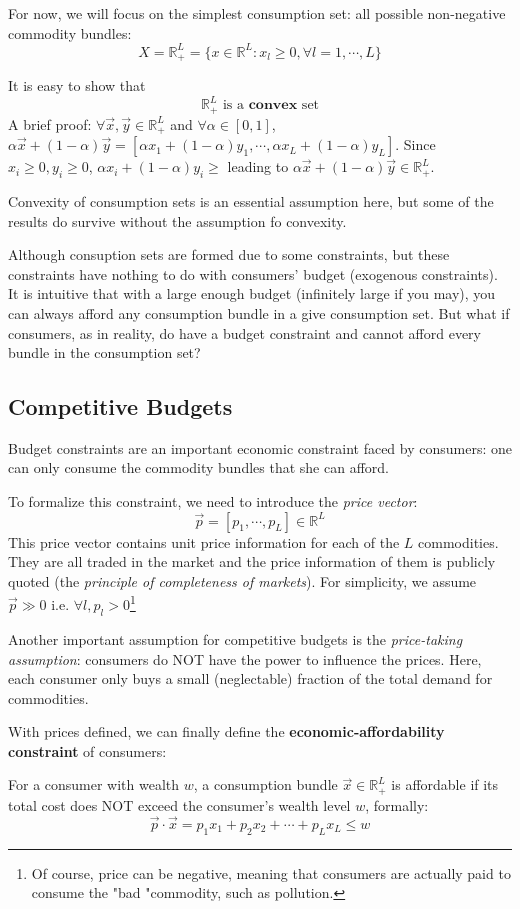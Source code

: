 For now, we will focus on the simplest consumption set: all possible non-negative commodity bundles:
$$X=\mathbb{R}^L_+=\{x\in \mathbb{R}^L: x_l\geq 0,\forall l=1,\cdots, L\}$$

It is easy to show that
$$\mathbb{R}^L_+ \text{ is a }\textbf{convex} \text{ set}$$
A brief proof: $\forall \vec{x},\vec{y}\in \mathbb{R}^L_+$ and $\forall\alpha \in [0,1]$, $\alpha\vec{x}+(1-\alpha)\vec{y}=\left[\alpha x_1+(1-\alpha)y_1,\cdots,\alpha x_L+(1-\alpha)y_L\right]$. Since $x_i\geq 0,y_i\geq 0$, $\alpha x_i+(1-\alpha)y_i\geq $ leading to $\alpha\vec{x}+(1-\alpha)\vec{y}\in \mathbb{R}^L_+$.

Convexity of consumption sets is an essential assumption here, but some of the results do survive without the assumption fo convexity.

Although consuption sets are formed due to some constraints, but these constraints have nothing to do with consumers' budget (exogenous constraints). It is intuitive that with a large enough budget (infinitely large if you may), you can always afford any consumption bundle in a give consumption set. But what if consumers, as in reality, do have a budget constraint and cannot afford every bundle in the consumption set?

\subsection{Competitive Budgets}
Budget constraints are an important economic constraint faced by consumers: one can only consume the commodity bundles that she can afford.

To formalize this constraint, we need to introduce the \textit{price vector}: 
$$\vec{p}=\left[p_1,\cdots,p_L\right]\in \mathbb{R}^L$$
This price vector contains unit price information for each of the $L$ commodities. They are all traded in the market and the price information of them is publicly quoted (the \textit{principle of completeness of markets}).
For simplicity, we assume $\vec{p}\gg 0$ i.e. $\forall l,p_l>0$\footnote{Of course, price can be negative, meaning that consumers are actually paid to consume the "bad "commodity, such as pollution.}

Another important assumption for competitive budgets is the \textit{price-taking assumption}: consumers do NOT have the power to influence the prices. Here, each consumer only buys a small (neglectable) fraction of the total demand for commodities.

With prices defined, we can finally define the \textbf{economic-affordability constraint} of consumers:
\begin{definition}
    For a consumer with wealth $w$, a consumption bundle $\vec{x}\in \mathbb{R}^L_+$ is affordable if its total cost does NOT exceed the consumer's wealth level $w$, formally:
    $$\vec{p}\cdot \vec{x}=p_1x_1+p_2x_2+\cdots+p_Lx_L\leq w$$
\end{definition}